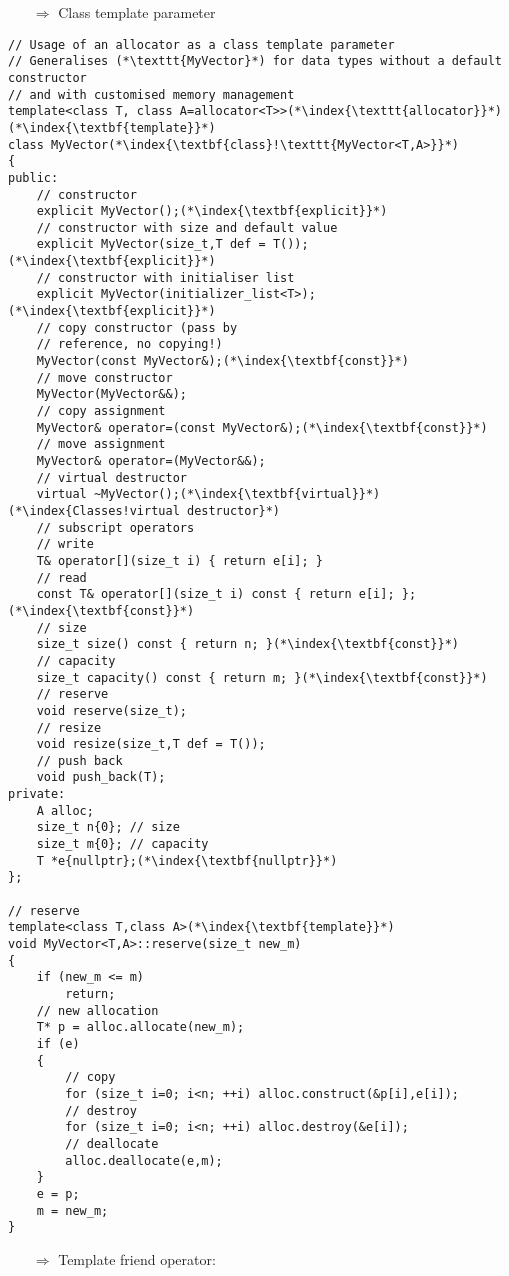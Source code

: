 \documentclass[10pt]{article}
\begin{document}
\begin{enumerate}
\item[$\Rightarrow$] Class template parameter
\end{enumerate}
\begin{lstlisting}
// Usage of an allocator as a class template parameter
// Generalises (*\texttt{MyVector}*) for data types without a default constructor
// and with customised memory management
template<class T, class A=allocator<T>>(*\index{\texttt{allocator}}*)(*\index{\textbf{template}}*)
class MyVector(*\index{\textbf{class}!\texttt{MyVector<T,A>}}*)
{
public:
    // constructor
    explicit MyVector();(*\index{\textbf{explicit}}*)
    // constructor with size and default value
    explicit MyVector(size_t,T def = T());(*\index{\textbf{explicit}}*)
    // constructor with initialiser list
    explicit MyVector(initializer_list<T>);(*\index{\textbf{explicit}}*)
    // copy constructor (pass by
    // reference, no copying!)
    MyVector(const MyVector&);(*\index{\textbf{const}}*)
    // move constructor
    MyVector(MyVector&&);
    // copy assignment
    MyVector& operator=(const MyVector&);(*\index{\textbf{const}}*)
    // move assignment
    MyVector& operator=(MyVector&&);
    // virtual destructor
    virtual ~MyVector();(*\index{\textbf{virtual}}*)(*\index{Classes!virtual destructor}*)
    // subscript operators
    // write
    T& operator[](size_t i) { return e[i]; }
    // read
    const T& operator[](size_t i) const { return e[i]; };(*\index{\textbf{const}}*)
    // size
    size_t size() const { return n; }(*\index{\textbf{const}}*)
    // capacity
    size_t capacity() const { return m; }(*\index{\textbf{const}}*)
    // reserve
    void reserve(size_t);
    // resize
    void resize(size_t,T def = T());
    // push back
    void push_back(T);
private:
    A alloc;
    size_t n{0}; // size
    size_t m{0}; // capacity
    T *e{nullptr};(*\index{\textbf{nullptr}}*)
};

// reserve
template<class T,class A>(*\index{\textbf{template}}*)
void MyVector<T,A>::reserve(size_t new_m)
{
    if (new_m <= m)
        return;
    // new allocation
    T* p = alloc.allocate(new_m);
    if (e)
    {
        // copy
        for (size_t i=0; i<n; ++i) alloc.construct(&p[i],e[i]);
        // destroy
        for (size_t i=0; i<n; ++i) alloc.destroy(&e[i]);
        // deallocate
        alloc.deallocate(e,m);
    }
    e = p;
    m = new_m;
}
\end{lstlisting}
\begin{enumerate}
\item[$\Rightarrow$] Template friend operator:
\end{enumerate}
\end{document}
